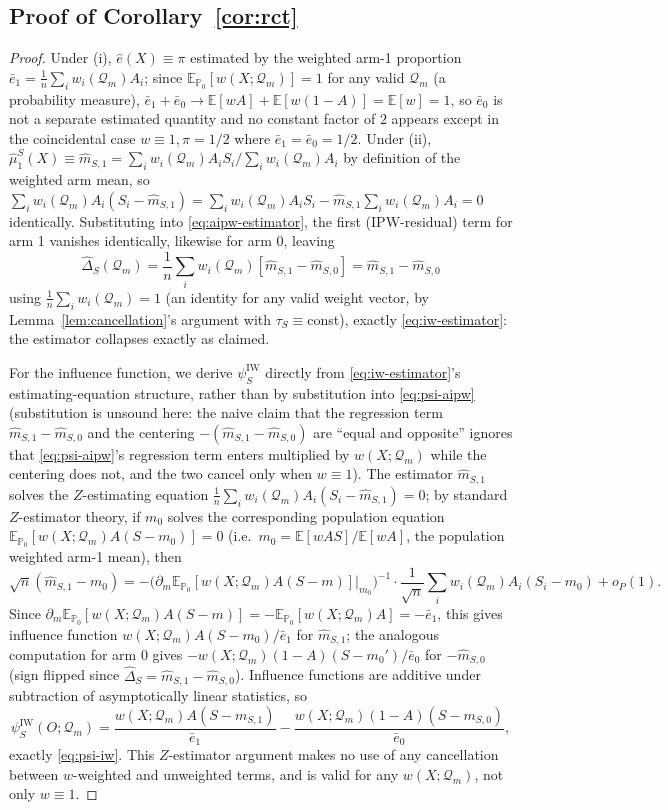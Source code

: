 \documentclass[11pt]{article}
\theoremstyle{plain}
\theoremstyle{definition}
\theoremstyle{remark}
\newcommand{\E}{\mathbb{E}}
\newcommand{\PP}{\mathbb{P}}
\newcommand{\Q}{\mathcal{Q}}
\newcommand{\ehat}{\widehat{e}}
\begin{document}
\subsection{Proof of Corollary~\ref{cor:rct}}\label{app:proof-rct}

\begin{proof}
Under (i), $\ehat(X)\equiv\pi$ estimated by the weighted arm-1 proportion
$\bar e_1=\frac1n\sum_iw_i(\Q_m)A_i$; since $\E_{\PP_0}[w(X;\Q_m)]=1$ for any valid
$\Q_m$ (a probability measure), $\bar e_1+\bar e_0\to\E[w A]+\E[w(1-A)]=\E[w]=1$, so
$\bar e_0$ is not a separate estimated quantity and no constant factor of $2$ appears
except in the coincidental case $w\equiv1,\pi=1/2$ where $\bar e_1=\bar e_0=1/2$.
Under (ii), $\hat\mu_1^S(X)\equiv\hat m_{S,1}=\sum_iw_i(\Q_m)A_iS_i/\sum_iw_i(\Q_m)A_i$
by definition of the weighted arm mean, so
$\sum_iw_i(\Q_m)A_i(S_i-\hat m_{S,1})=\sum_iw_i(\Q_m)A_iS_i-\hat m_{S,1}\sum_iw_i(\Q_m)A_i=0$
identically. Substituting into \eqref{eq:aipw-estimator}, the first (IPW-residual)
term for arm 1 vanishes identically, likewise for arm 0, leaving
\[
    \hat\Delta_S(\Q_m) = \frac1n\sum_iw_i(\Q_m)[\hat m_{S,1}-\hat m_{S,0}] = \hat m_{S,1}-\hat m_{S,0}
\]
using $\frac1n\sum_iw_i(\Q_m)=1$ (an identity for any valid weight vector, by
Lemma~\ref{lem:cancellation}'s argument with $\tau_S\equiv$const), exactly
\eqref{eq:iw-estimator}: the estimator collapses exactly as claimed.

For the influence function, we derive $\psi_S^{\mathrm{IW}}$ directly from
\eqref{eq:iw-estimator}'s estimating-equation structure, rather than by substitution
into \eqref{eq:psi-aipw} (substitution is unsound here: the naive claim that the
regression term $\hat m_{S,1}-\hat m_{S,0}$ and the centering
$-(\hat m_{S,1}-\hat m_{S,0})$ are ``equal and opposite'' ignores that
\eqref{eq:psi-aipw}'s regression term enters multiplied by $w(X;\Q_m)$ while the
centering does not, and the two cancel only when $w\equiv1$). The estimator
$\hat m_{S,1}$ solves the $Z$-estimating equation
$\frac1n\sum_iw_i(\Q_m)A_i(S_i-\hat m_{S,1})=0$; by standard $Z$-estimator theory, if
$m_0$ solves the corresponding population equation $\E_{\PP_0}[w(X;\Q_m)A(S-m_0)]=0$
(i.e.\ $m_0=\E[wAS]/\E[wA]$, the population weighted arm-1 mean), then
\[
    \sqrt n(\hat m_{S,1}-m_0) = -\Big(\partial_m\E_{\PP_0}[w(X;\Q_m)A(S-m)]\Big|_{m_0}\Big)^{-1}
    \cdot\frac1{\sqrt n}\sum_iw_i(\Q_m)A_i(S_i-m_0) + o_P(1).
\]
Since $\partial_m\E_{\PP_0}[w(X;\Q_m)A(S-m)]=-\E_{\PP_0}[w(X;\Q_m)A]=-\bar e_1$, this
gives influence function $w(X;\Q_m)A(S-m_0)/\bar e_1$ for $\hat m_{S,1}$; the
analogous computation for arm $0$ gives $-w(X;\Q_m)(1-A)(S-m_0')/\bar e_0$ for
$-\hat m_{S,0}$ (sign flipped since $\hat\Delta_S=\hat m_{S,1}-\hat m_{S,0}$).
Influence functions are additive under subtraction of asymptotically linear
statistics, so
\[
    \psi_S^{\mathrm{IW}}(O;\Q_m) = \frac{w(X;\Q_m)A(S-m_{S,1})}{\bar e_1}
        - \frac{w(X;\Q_m)(1-A)(S-m_{S,0})}{\bar e_0},
\]
exactly \eqref{eq:psi-iw}. This $Z$-estimator argument makes no use of any
cancellation between $w$-weighted and unweighted terms, and is valid for any
$w(X;\Q_m)$, not only $w\equiv1$.
\end{proof}
\end{document}
